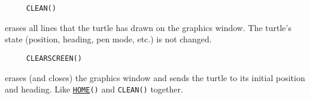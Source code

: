 \begin{verbatim}
     CLEAN()
\end{verbatim}
erases all lines that the turtle has drawn on the graphics window.
The turtle's state (position, heading, pen mode, etc.) is not changed.

\begin{verbatim}
     CLEARSCREEN()
\end{verbatim}
erases (and closes) the graphics window and sends the turtle to its
initial position and heading.  Like
\texttt{\hyperref[logoturtle:home]{HOME}()} and \texttt{CLEAN()}
together.







